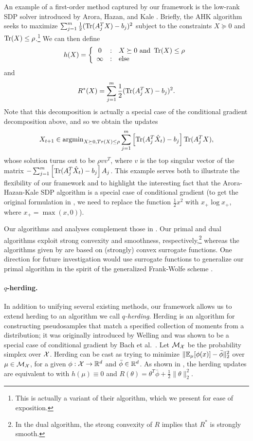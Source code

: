 \documentclass{article} %
\newcommand{\new}{\marginpar{\textcolor{NAColor}{NEW}}}
\begin{document}
An example of a first-order method captured by our framework is 
the low-rank SDP solver introduced by Arora, Hazan, and Kale \cite{aroraSDP}. 
Briefly, the AHK algorithm seeks to maximize 
$\sum_{j=1}^m \frac{1}{2}(\operatorname{Tr}(A_j^TX)-b_j)^2$ subject to the 
constraints $X \succeq 0$ and $\operatorname{Tr}(X) \leq \rho$.\footnote{This is actually a 
variant of their algorithm, which we present for ease of exposition.} We 
can then define 
\[ h(X) = \left\{ \begin{array}{ccl} 0 & : & X \succeq 0\mathrm{ \ and \ }\operatorname{Tr}(X) \leq \rho \\ \infty & : & \mathrm{else} \end{array} \right.\]
and
\[ R^*(X) = \sum_{j=1}^m \frac{1}{2}(\operatorname{Tr}(A_j^TX)-b_j)^2. \]
Note that this decomposition is actually a special case of the conditional 
gradient decomposition above, and so we obtain the updates 
\[ X_{t+1} \in \operatorname{argmin}_{X \succeq 0, Tr(X) \leq \rho} \sum_{j=1}^m \left[\operatorname{Tr}(A_j^T\hat{X}_t)-b_j\right]\operatorname{Tr}(A_j^TX), \]
whose solution turns out to be $\rho vv^T$, where $v$ is the top singular 
vector of the matrix
$-\sum_{j=1}^m \left[\operatorname{Tr}(A_j^T\hat{X}_t)-b_j\right]A_j$. This example serves both 
to illustrate the flexibility of our framework and to highlight the interesting 
fact that the Arora-Hazan-Kale SDP algorithm is a special case of conditional 
gradient (to get the original formulation in \cite{aroraSDP}, we need to replace 
the function $\frac{1}{2}x^2$ with $x_{+}\log x_{+}$, where $x_{+} = \max(x,0)$).

 \new Our algorithms and 
analyses complement those in \cite{Mairal:2013}. Our primal and dual 
algorithms exploit strong convexity and smoothness, respectively,\footnote{
In the dual algorithm, the strong convexity of $R$ implies that 
$R^{*}$ is strongly smooth.} whereas the algorithms given by \cite{Mairal:2013} 
are based on (strongly) convex surrogate functions. One direction for 
future investigation would use surrogate functions to generalize 
our primal algorithm in the spirit of the generalized Frank-Wolfe
scheme \cite[Algorithm 3]{Mairal:2013}.


\paragraph{$q$-herding.}
In addition to unifying several existing methods, our framework allows us to 
extend herding to an algorithm we call \emph{$q$-herding}. Herding is 
an algorithm for constructing pseudosamples that match a specified collection 
of moments from a distribution; it was originally introduced by Welling 
\cite{Welling:2009a} and was shown to be a special case of conditional gradient 
by Bach et al.~\cite{Bach:2012a}. Let $\mathcal{M}_{\mathcal{X}}$ be the probability simplex over 
$\mathcal{X}$. Herding can be cast as trying to minimize 
$\|\mathbb{E}_{\mu}[\phi(x)]-\bar{\phi}\|_2^2$ over $\mu \in \mathcal{M}_{\mathcal{X}}$, for a
given $\phi : \mathcal{X} \to \mathbb{R}^d$ and $\bar{\phi} \in \mathbb{R}^d$. As shown in 
\cite{Bach:2012a}, the herding updates are equivalent to \dual with 
$h(\mu) \equiv 0$ and $R(\theta) = \theta^T\bar{\phi} + \frac{1}{2}\|\theta\|_2^2$.
\end{document}
